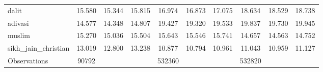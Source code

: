 {\begin{tabular}{l*{3}{ccc}}
dalit               &      15.580&      15.344&      15.815&      16.974&      16.873&      17.075&      18.634&      18.529&      18.738\\
adivasi             &      14.577&      14.348&      14.807&      19.427&      19.320&      19.533&      19.837&      19.730&      19.945\\
muslim              &      15.270&      15.036&      15.504&      15.643&      15.546&      15.741&      14.657&      14.563&      14.752\\
sikh\_jain\_christian &      13.019&      12.800&      13.238&      10.877&      10.794&      10.961&      11.043&      10.959&      11.127\\
\hline
Observations        &       90792&            &            &      532360&            &            &      532820&            &            \\
\hline\hline
\end{tabular}
}
